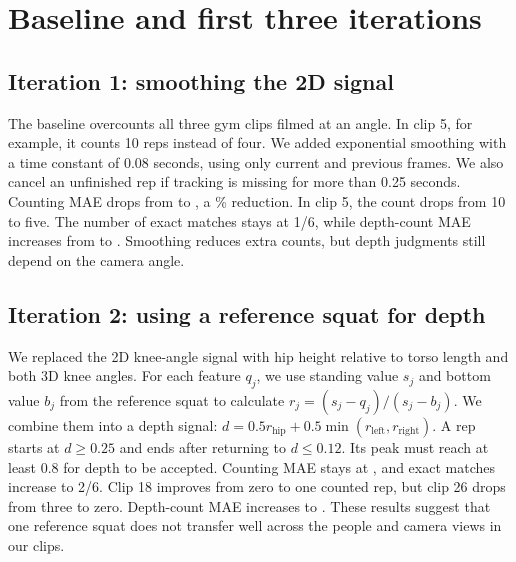 \documentclass[10pt,letterpaper]{article}
\newcommand{\reportassets}{}
\renewcommand{\reportassets}{../../data/reports/midpoint/}%
\renewcommand{\reportassets}{data/reports/midpoint/}%
\begin{document}
\clearpage
\section{Baseline and first three iterations}
\begin{center}

\end{center}

\subsection{Iteration 1: smoothing the 2D signal}
The baseline overcounts all three gym clips filmed at an angle. In clip 5,
for example, it counts 10 reps instead of four. We added exponential smoothing
with a time constant of 0.08 seconds, using only current and previous frames.
We also cancel an unfinished rep if tracking is missing for more than
0.25 seconds. Counting MAE drops from \BaseMAE{} to \SmoothMAE{}, a
\CountReduction{}\% reduction. In clip 5, the count drops from 10 to five.
The number of exact matches stays at 1/6, while depth-count MAE increases from
\BaseDepthMAE{} to \SmoothDepthMAE{}. Smoothing reduces extra counts, but depth
judgments still depend on the camera angle.

\subsection{Iteration 2: using a reference squat for depth}
We replaced the 2D knee-angle signal with hip height relative to torso length
and both 3D knee angles. For each feature $q_j$, we use standing value $s_j$ and
bottom value $b_j$ from the reference squat to calculate
$r_j=(s_j-q_j)/(s_j-b_j)$. We combine them into a depth signal:
$d=0.5r_{\mathrm{hip}}+0.5\min(r_{\mathrm{left}},r_{\mathrm{right}})$.
A rep starts at $d\geq0.25$ and ends after returning to $d\leq0.12$.
Its peak must reach at least 0.8 for depth to be accepted. Counting MAE stays at
\RefMAE{}, and exact matches increase to 2/6. Clip 18 improves from zero to one
counted rep, but clip 26 drops from three to zero. Depth-count MAE increases to
\RefDepthMAE{}. These results suggest that one reference squat does not transfer
well across the people and camera views in our clips.
\end{document}
